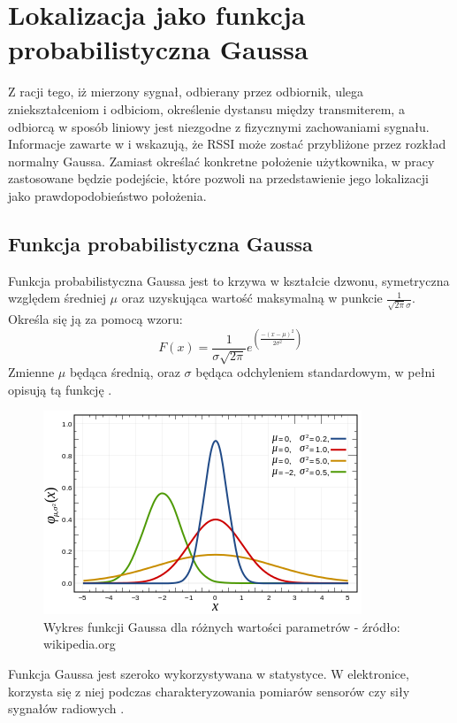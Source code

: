 \section{Lokalizacja jako funkcja probabilistyczna Gaussa}
Z racji tego, iż mierzony sygnał, odbierany przez odbiornik, ulega zniekształceniom i odbiciom, określenie dystansu między transmiterem, a odbiorcą w sposób liniowy jest niezgodne z fizycznymi zachowaniami sygnału. Informacje zawarte w \cite{YX} i \cite{KKPK} wskazują, że RSSI może zostać przybliżone przez rozkład normalny Gaussa. Zamiast określać konkretne położenie użytkownika, w pracy zastosowane będzie podejście, które pozwoli na przedstawienie jego lokalizacji jako prawdopodobieństwo położenia.\\
\subsection{Funkcja probabilistyczna Gaussa}
Funkcja probabilistyczna Gaussa jest to krzywa w kształcie dzwonu, symetryczna względem średniej $\mu$ oraz uzyskująca wartość maksymalną w punkcie $\frac{1}{\sqrt{2\pi}\sigma}$.
Określa się ją za pomocą wzoru:
\begin{equation}
F(x) = \frac{1}{\sigma\sqrt{2\pi}}e^{\left(\frac{-(x-\mu)^2}{2\sigma^2}\right)}
\end{equation}
Zmienne $\mu$ będąca średnią, oraz $\sigma$ będąca odchyleniem standardowym, w pełni opisują tą funkcję \cite{MIR}.
\begin{figure}[H]			
	\centering
	\caption{Wykres funkcji Gaussa dla różnych wartości parametrów - źródło: \mbox{wikipedia.org}}
	\includegraphics{funkcja_Gaussa}
\end{figure}
Funkcja Gaussa jest szeroko wykorzystywana w statystyce. W elektronice, korzysta się z niej podczas charakteryzowania pomiarów sensorów czy siły sygnałów radiowych \cite{HMA}.
